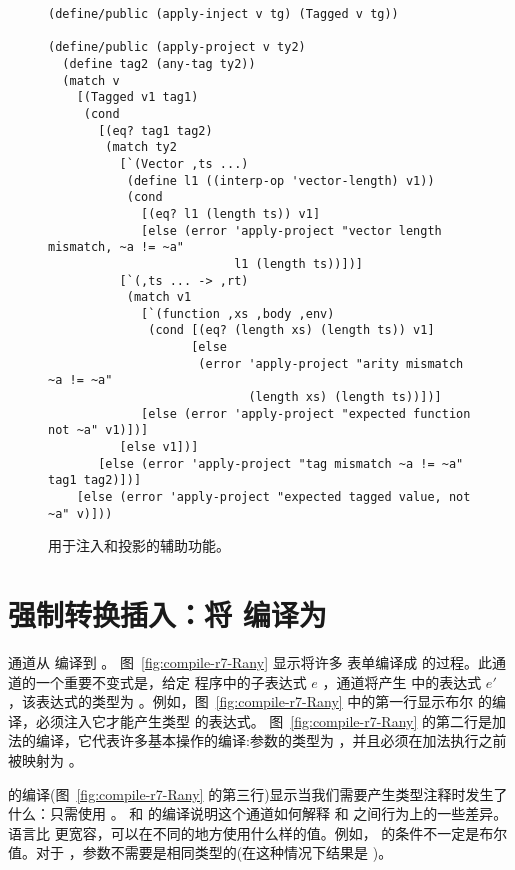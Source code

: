 \documentclass[11pt]{book}
\begin{document}
\begin{figure}[tbp]
\begin{lstlisting}
(define/public (apply-inject v tg) (Tagged v tg))

(define/public (apply-project v ty2)
  (define tag2 (any-tag ty2))
  (match v
    [(Tagged v1 tag1)
     (cond
       [(eq? tag1 tag2)
        (match ty2
          [`(Vector ,ts ...)
           (define l1 ((interp-op 'vector-length) v1))
           (cond
             [(eq? l1 (length ts)) v1]
             [else (error 'apply-project "vector length mismatch, ~a != ~a"
                          l1 (length ts))])]
          [`(,ts ... -> ,rt)
           (match v1
             [`(function ,xs ,body ,env)
              (cond [(eq? (length xs) (length ts)) v1]
                    [else
                     (error 'apply-project "arity mismatch ~a != ~a"
                            (length xs) (length ts))])]
             [else (error 'apply-project "expected function not ~a" v1)])]
          [else v1])]
       [else (error 'apply-project "tag mismatch ~a != ~a" tag1 tag2)])]
    [else (error 'apply-project "expected tagged value, not ~a" v)]))
\end{lstlisting}
  \caption{用于注入和投影的辅助功能。}
  \label{fig:apply-project}
\end{figure}

\clearpage

\section{强制转换插入：将 \LangDyn{} 编译为 \LangAny{}}
\label{sec:compile-r7}

  通道从 \LangDyn{} 编译到 \LangAny{} 。
图~\ref{fig:compile-r7-Rany} 显示将许多
\LangDyn{} 表单编译成 \LangAny{} 的过程。此通道的一个重要不变式是，给定
\LangDyn{} 程序中的子表达式 $e$ ，通道将产生
\LangAny{} 中的表达式 $e'$ ，该表达式的类型为  。例如，图~\ref{fig:compile-r7-Rany} 中的第一行显示布尔  的编译，必须注入它才能产生类型  的表达式。
%
图~\ref{fig:compile-r7-Rany} 的第二行是加法的编译，它代表许多基本操作的编译:参数的类型为  ，并且必须在加法执行之前被映射为  。

  的编译(图~\ref{fig:compile-r7-Rany} 的第三行)显示当我们需要产生类型注释时发生了什么：只需使用  。
%
  和  的编译说明这个通道如何解释 \LangDyn{} 和
\LangAny{} 之间行为上的一些差异。 \LangDyn{} 语言比 \LangAny{} 更宽容，可以在不同的地方使用什么样的值。例如，  的条件不一定是布尔值。对于  ，参数不需要是相同类型的(在这种情况下结果是 )。
\end{document}

